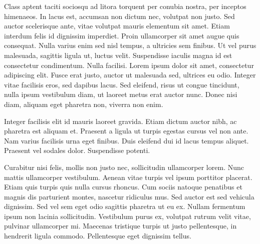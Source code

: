 \documentclass[convention]{aesconf}
\begin{document}
Class aptent taciti sociosqu ad litora torquent per conubia nostra, per inceptos himenaeos. In lacus est, accumsan non dictum nec, volutpat non justo. Sed auctor scelerisque ante, vitae volutpat mauris elementum sit amet. Etiam interdum felis id dignissim imperdiet. Proin ullamcorper sit amet augue quis consequat. Nulla varius enim sed nisl tempus, a ultricies sem finibus. Ut vel purus malesuada, sagittis ligula ut, luctus velit. Suspendisse iaculis magna id est consectetur condimentum. Nulla facilisi. Lorem ipsum dolor sit amet, consectetur adipiscing elit. Fusce erat justo, auctor ut malesuada sed, ultrices eu odio. Integer vitae facilisis eros, sed dapibus lacus. Sed eleifend, risus ut congue tincidunt, nulla ipsum vestibulum diam, ut laoreet metus erat auctor nunc. Donec nisi diam, aliquam eget pharetra non, viverra non enim.

Integer facilisis elit id mauris laoreet gravida. Etiam dictum auctor nibh, ac pharetra est aliquam et. Praesent a ligula ut turpis egestas cursus vel non ante. Nam varius facilisis urna eget finibus. Duis eleifend dui id lacus tempus aliquet. Praesent vel sodales dolor. Suspendisse potenti.

Curabitur nisi felis, mollis non justo nec, sollicitudin ullamcorper lorem. Nunc mattis ullamcorper vestibulum. Aenean vitae turpis vel ipsum porttitor placerat. Etiam quis turpis quis nulla cursus rhoncus. Cum sociis natoque penatibus et magnis dis parturient montes, nascetur ridiculus mus. Sed auctor est sed vehicula dignissim. Sed vel sem eget odio sagittis pharetra ut eu ex. Nullam fermentum ipsum non lacinia sollicitudin. Vestibulum purus ex, volutpat rutrum velit vitae, pulvinar ullamcorper mi. Maecenas tristique turpis ut justo pellentesque, in hendrerit ligula commodo. Pellentesque eget dignissim tellus.





\end{document}
